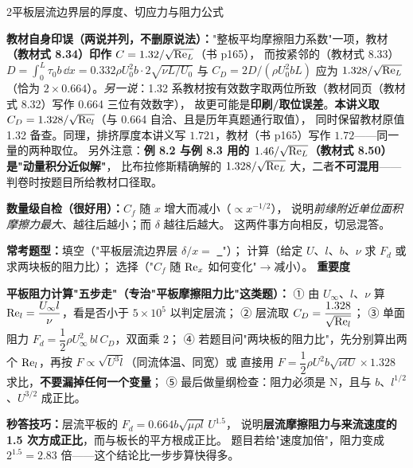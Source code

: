 \begin{kaodian}{2}{平板层流边界层的厚度、切应力与阻力公式}
\begin{tishi}
\textbf{教材自身印误（两说并列，不删原说法）：}"整板平均摩擦阻力系数"一项，教材\textbf{（教材式 8.34）印作 $C=1.32/\sqrt{\mathrm{Re}_L}$}（书 p165），
而按紧邻的（教材式 8.33）$D=\int_0^L\tau_0b\,\dd x=0.332\rho U_0^2b\cdot2\sqrt{\nu L/U_0}$ 与 $C_D=2D/(\rho U_0^2 bL)$ 应为
$1.328/\sqrt{\mathrm{Re}_L}$（恰为 $2\times0.664$）。\emph{另一说}：1.32 系教材按有效数字取两位所致（教材同页（教材式 8.32）写作 0.664 三位有效数字），
故更可能是\textbf{印刷/取位误差}。\textbf{本讲义取 $C_D=1.328/\sqrt{\mathrm{Re}_l}$}（与 0.664 自洽、且是历年真题通行取值），
同时保留教材原值 1.32 备查。同理，排挤厚度本讲义写 $1.721$，教材（书 p165）写作 $1.72$——同一量的两种取位。
另外注意：\textbf{例 8.2 与例 8.3 用的 $1.46/\sqrt{\mathrm{Re}_L}$（教材式 8.50）是"动量积分近似解"}，
比布拉修斯精确解的 $1.328/\sqrt{\mathrm{Re}_L}$ 大，二者\textbf{不可混用}——判卷时按题目所给教材口径取。
\end{tishi}

\textbf{数量级自检（很好用）：}$C_f$ 随 $x$ 增大而减小（$\propto x^{-1/2}$），
说明\emph{前缘附近单位面积摩擦力最大}、越往后越小；而 $\delta$ 越往后越大。
这两件事方向相反，切忌混答。

\textbf{常考题型：}填空（"平板层流边界层 $\delta/x=$ \underline{\ }"）；
计算（给定 $U$、$l$、$b$、$\nu$ 求 $F_d$ 或求两块板的阻力比）；
选择（"$C_f$ 随 $\mathrm{Re}_x$ 如何变化"$\to$减小）。
\textbf{重要度 }\quad{}\quad{}

\begin{banfa}
\textbf{平板阻力计算"五步走"（专治"平板摩擦阻力比"这类题）：}
① 由 $U_\infty$、$l$、$\nu$ 算 $\mathrm{Re}_l=\dfrac{U_\infty l}{\nu}$，看是否小于 $5\times10^5$ 以判定层流；
② 层流取 $C_D=\dfrac{1.328}{\sqrt{\mathrm{Re}_l}}$；
③ 单面阻力 $F_d=\dfrac12\rho U_\infty^2\,bl\,C_D$，双面乘 2；
④ 若题目问"两块板的阻力比"，先分别算出两个 $\mathrm{Re}_l$，再按 $F\propto \sqrt{U^3 l}$（同流体温、同宽）或
直接用 $F=\dfrac12\rho U^2b\sqrt{\nu l U}\times1.328$ 求比，\textbf{不要漏掉任何一个变量}；
⑤ 最后做量纲检查：阻力必须是 N，且与 $b$、$l^{1/2}$、$U^{3/2}$ 成正比。

\textbf{秒答技巧：}层流平板的 $F_d=0.664b\sqrt{\mu\rho l}\,U^{1.5}$，
说明\textbf{层流摩擦阻力与来流速度的 1.5 次方成正比}，而与板长的平方根成正比。
题目若给"速度加倍"，阻力变成 $2^{1.5}=2.83$ 倍——这个结论比一步步算快得多。
\end{banfa}
\end{kaodian}

